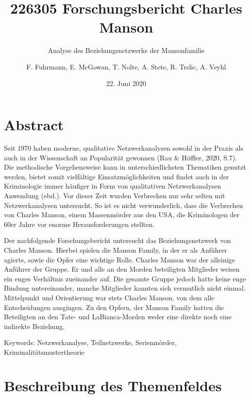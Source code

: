 \documentclass[
]{article}
\title{226305 Forschungsbericht Charles Manson}
\subtitle{Analyse des Beziehungsnetzwerks der Mansonfamilie}
\author{F. Fuhrmann, E. McGowan, T. Nolte, A. Stete, R. Trslic, A. Veyhl}
\date{22. Juni 2020}
\newenvironment{Shaded}{\begin{snugshade}}{\end{snugshade}}
\newcommand{\DataTypeTok}[1]{\textcolor[rgb]{0.13,0.29,0.53}{#1}}
\newcommand{\DecValTok}[1]{\textcolor[rgb]{0.00,0.00,0.81}{#1}}
\newcommand{\KeywordTok}[1]{\textcolor[rgb]{0.13,0.29,0.53}{\textbf{#1}}}
\newcommand{\NormalTok}[1]{#1}
\newcommand{\OperatorTok}[1]{\textcolor[rgb]{0.81,0.36,0.00}{\textbf{#1}}}
\newcommand{\OtherTok}[1]{\textcolor[rgb]{0.56,0.35,0.01}{#1}}
\begin{document}
\maketitle

{
\setcounter{tocdepth}{3}
\tableofcontents
}
\begin{Shaded}
\end{Shaded}

\hypertarget{abstract}{%
\section{Abstract}\label{abstract}}

Seit 1970 haben moderne, qualitative Netzwerkanalysen sowohl in der
Praxis als auch in der Wissenschaft an Popularität gewonnen (Rau \&
Höffler, 2020, S.7). Die methodische Vorgehensweise kann in
unterschiedlichsten Thematiken genutzt werden, bietet somit vielfältige
Einsatzmöglichkeiten und findet auch in der Kriminologie immer häufiger
in Form von qualitativen Netzwerkanalysen Anwendung (ebd.). Vor dieser
Zeit wurden Verbrechen nur sehr selten mit Netzwerkanalysen untersucht.
So ist es nicht verwunderlich, dass die Verbrechen von Charles Manson,
einem Massenmörder aus den USA, die Kriminologen der 60er Jahre vor
enorme Herausforderungen stellten.

Der nachfolgende Forschungsbericht untersucht das Beziehungsnetzwerk von
Charles Manson. Hierbei spielen die Manson Family, in der er als
Anführer agierte, sowie die Opfer eine wichtige Rolle. Charles Manson
war der alleinige Anführer der Gruppe. Er und alle an den Morden
beteiligten Mitglieder weisen ein enges Verhältnis zueinander auf. Die
gesamte Gruppe jedoch hatte keine enge Bindung untereinander, manche
Mitglieder kannten sich vermutlich nicht einmal. Mittelpunkt und
Orientierung war stets Charles Manson, von dem alle Entscheidungen
ausgingen. Zu den Opfern, der Manson Family hatten die Beteiligten an
den Tate- und LaBianca-Morden weder eine direkte noch eine indirekte
Beziehung.

Keywords: Netzwerkanalyse, Teilnetzwerke, Serienmörder,
Kriminalitätsmustertheorie

\hypertarget{beschreibung-des-themenfeldes}{%
\section{Beschreibung des
Themenfeldes}\label{beschreibung-des-themenfeldes}}
\end{document}
